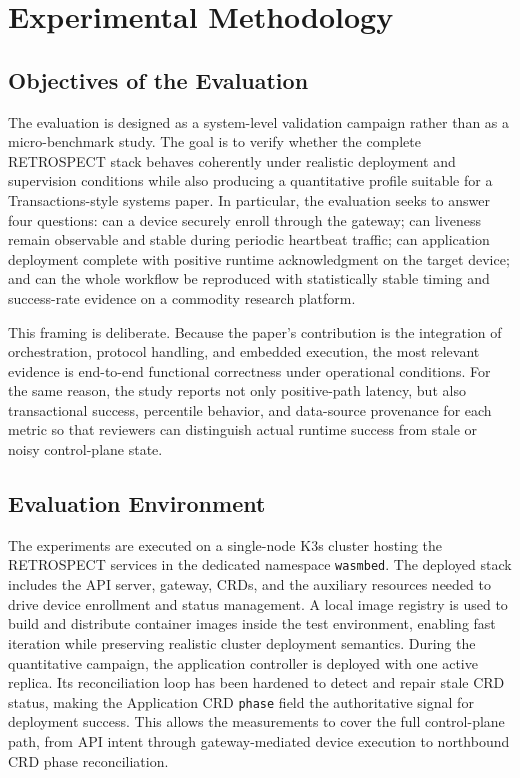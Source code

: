 \section{Experimental Methodology}

\subsection{Objectives of the Evaluation}
The evaluation is designed as a system-level validation campaign rather than as a micro-benchmark study. The goal is to verify whether the complete RETROSPECT stack behaves coherently under realistic deployment and supervision conditions while also producing a quantitative profile suitable for a Transactions-style systems paper. In particular, the evaluation seeks to answer four questions: can a device securely enroll through the gateway; can liveness remain observable and stable during periodic heartbeat traffic; can application deployment complete with positive runtime acknowledgment on the target device; and can the whole workflow be reproduced with statistically stable timing and success-rate evidence on a commodity research platform.

This framing is deliberate. Because the paper's contribution is the integration of orchestration, protocol handling, and embedded execution, the most relevant evidence is end-to-end functional correctness under operational conditions. For the same reason, the study reports not only positive-path latency, but also transactional success, percentile behavior, and data-source provenance for each metric so that reviewers can distinguish actual runtime success from stale or noisy control-plane state.

\subsection{Evaluation Environment}
The experiments are executed on a single-node K3s cluster hosting the RETROSPECT services in the dedicated namespace \texttt{wasmbed}. The deployed stack includes the API server, gateway, CRDs, and the auxiliary resources needed to drive device enrollment and status management. A local image registry is used to build and distribute container images inside the test environment, enabling fast iteration while preserving realistic cluster deployment semantics. During the quantitative campaign, the application controller is deployed with one active replica. Its reconciliation loop has been hardened to detect and repair stale CRD status, making the Application CRD \texttt{phase} field the authoritative signal for deployment success. This allows the measurements to cover the full control-plane path, from API intent through gateway-mediated device execution to northbound CRD phase reconciliation.

